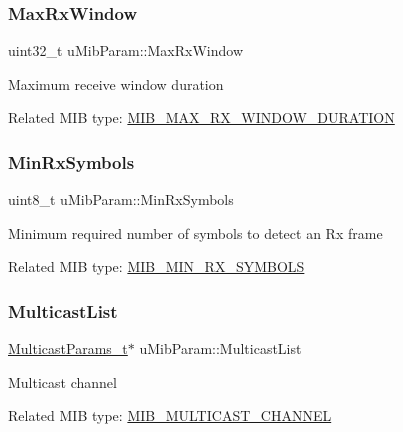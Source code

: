 \subsubsection{\texorpdfstring{Max\+Rx\+Window}{MaxRxWindow}}
{\footnotesize\ttfamily uint32\+\_\+t u\+Mib\+Param\+::\+Max\+Rx\+Window}

Maximum receive window duration

Related M\+IB type\+: \hyperlink{group__LORAMAC_gga32ea83d13a3f5bb4b3ec2ace2319ab61ad6ba0cae3e33f0cf042ded8936d965da}{M\+I\+B\+\_\+\+M\+A\+X\+\_\+\+R\+X\+\_\+\+W\+I\+N\+D\+O\+W\+\_\+\+D\+U\+R\+A\+T\+I\+ON} \mbox{\label{unionuMibParam_a1eec512351464514fafd9860041b9f2a}} 
\subsubsection{\texorpdfstring{Min\+Rx\+Symbols}{MinRxSymbols}}
{\footnotesize\ttfamily uint8\+\_\+t u\+Mib\+Param\+::\+Min\+Rx\+Symbols}

Minimum required number of symbols to detect an Rx frame

Related M\+IB type\+: \hyperlink{group__LORAMAC_gga32ea83d13a3f5bb4b3ec2ace2319ab61a82fb27fd6414d2bde20a7a00c80e26a1}{M\+I\+B\+\_\+\+M\+I\+N\+\_\+\+R\+X\+\_\+\+S\+Y\+M\+B\+O\+LS} \mbox{\label{unionuMibParam_a3a577a31c0893ac6058a554c3e894535}} 
\subsubsection{\texorpdfstring{Multicast\+List}{MulticastList}}
{\footnotesize\ttfamily \hyperlink{group__LORAMAC_ga02d2523505cac70954c043074087ea65}{Multicast\+Params\+\_\+t}$\ast$ u\+Mib\+Param\+::\+Multicast\+List}

Multicast channel

Related M\+IB type\+: \hyperlink{group__LORAMAC_gga32ea83d13a3f5bb4b3ec2ace2319ab61af8ac424460fccb3115c6fe6ccb450862}{M\+I\+B\+\_\+\+M\+U\+L\+T\+I\+C\+A\+S\+T\+\_\+\+C\+H\+A\+N\+N\+EL} \mbox{\label{unionuMibParam_a28a692f38f8742b309d7973648a6d612}} 
